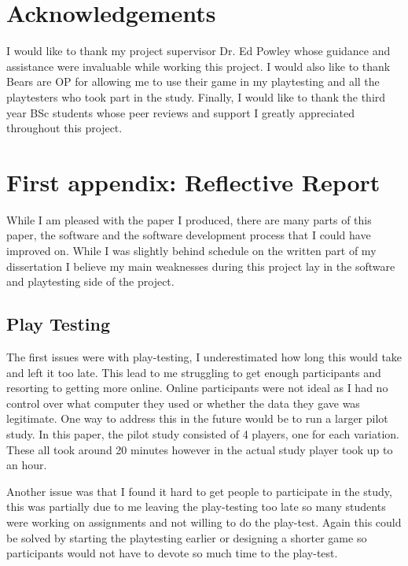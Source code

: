 \documentclass[journal]{IEEEtran}
\begin{document}
	
	
	
	\appendices
	\section{Acknowledgements}
	I would like to thank my project supervisor Dr. Ed Powley whose guidance and assistance were invaluable while working this project.
	I would also like to thank Bears are OP for allowing me to use their game in my playtesting and all the playtesters who took part in the study.
	Finally, I would like to thank the third year BSc students whose peer reviews and support I greatly appreciated throughout this project. 
	
	\section{First appendix: Reflective Report}
	
	While I am pleased with the paper I produced, there are many parts of this paper, the software and the software development process that I could have improved on. While I was slightly behind schedule on the written part of my dissertation I believe my main weaknesses during this project lay in the software and playtesting side of the project.    
	
	\subsection{Play Testing}
	The first issues were with play-testing, I underestimated how long this would take and left it too late. This lead to me struggling to get enough participants and resorting to getting more online. Online participants were not ideal as I had no control over what computer they used or whether the data they gave was legitimate. One way to address this in the future would be to run a larger pilot study. In this paper, the pilot study consisted of 4 players, one for each variation. These all took around 20 minutes however in the actual study player took up to an hour.     
	
	Another issue was that I found it hard to get people to participate in the study, this was partially due to me leaving the play-testing too late so many students were working on assignments and not willing to do the play-test. Again this could be solved by starting the playtesting earlier or designing a shorter game so participants would not have to devote so much time to the play-test.
	
\end{document}
